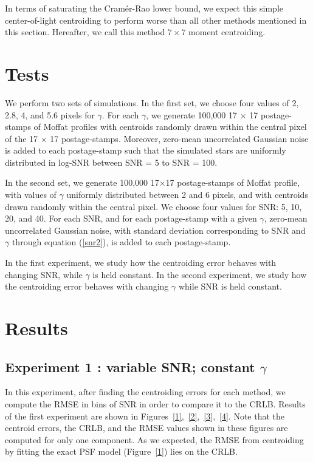 In terms of saturating the Cram\'{e}r-Rao lower bound, we expect this simple 
center-of-light centroiding to perform worse than all other methods mentioned in 
this section. Hereafter, we call this method $7\times7$ moment centroiding.

\section{Tests}\label{sec:cdata}

We perform two sets of simulations. In the first set, we choose four values of
2, 2.8, 4, and 5.6 pixels for $\gamma$. For each $\gamma$, we generate 100,000 
17 $\times$ 17 postage-stamps of Moffat profiles with centroids randomly drawn
within the central pixel of the 17 $\times$ 17 postage-stamps. Moreover, zero-mean 
uncorrelated Gaussian noise is added to each postage-stamp such that the simulated 
stars are uniformly distributed in log-SNR between SNR = 5 to SNR = 100.

In the second set, we generate 100,000 17$\times$17 postage-stamps
of Moffat profile, with values of $\gamma$ uniformly distributed 
between 2 and 6 pixels, and with centroids drawn randomly within 
the central pixel. We choose four values for SNR: 5, 10, 20, and 40. 
For each SNR, and for each postage-stamp with a given $\gamma$, 
zero-mean uncorrelated Gaussian noise, with standard deviation corresponding 
to SNR and $\gamma$ through equation (\ref{snr2}), is added to each postage-stamp.

In the first experiment, we study how the centroiding error behaves with changing
SNR, while $\gamma$ is held constant. In the second experiment, we study 
how the centroiding error behaves with changing $\gamma$ while SNR is held constant.

\section{Results}\label{sec:cresult}

\subsection{Experiment 1 : variable SNR; constant $\gamma$}
   
In this experiment, after finding the centroiding errors for each method,
we compute the RMSE in bins of SNR in order to compare it to the CRLB. 
Results of the first experiment are shown in Figures~\ref{1},~\ref{2},~\ref{3},~\ref{4}. Note that the centroid errors, the CRLB, and the RMSE values shown in these figures are computed for only one component. As we expected, the RMSE from centroiding by fitting the exact PSF model (Figure~\ref{1}) lies on the CRLB. 

